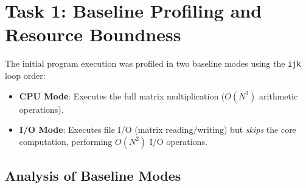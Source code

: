 \documentclass[11pt, a4paper]{article}
\begin{document}
\section{Task 1: Baseline Profiling and Resource Boundness}

The initial program execution was profiled in two baseline modes using the \texttt{ijk} loop order:
\begin{itemize}
    \item \textbf{CPU Mode}: Executes the full matrix multiplication ($O(N^3)$ arithmetic operations).
    \item \textbf{I/O Mode}: Executes file I/O (matrix reading/writing) but \emph{skips} the core computation, performing $O(N^2)$ I/O operations.
\end{itemize}

\subsection{Analysis of Baseline Modes}
\end{document}
